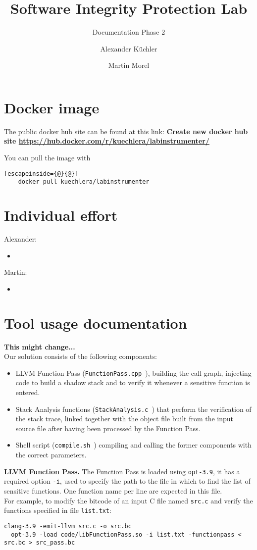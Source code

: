 \documentclass{llncs}
\title{Software Integrity Protection Lab}
\subtitle{Documentation Phase 2}
\author{Alexander K\"uchler \and Martin Morel}
\institute{Technical University of Munich\\
Department of Computer Science\\
\email{kuechler@in.tum.de}, \email{martin.morel@tum.de}}
\newcommand{\todo}[1]{\textbf{\color{red} #1}}
\newcommand{\llvmpass}{\texttt{FunctionPass.cpp }}
\newcommand{\stacka}{\texttt{StackAnalysis.c }}
\newcommand{\script}{\texttt{compile.sh }}
\begin{document}
\maketitle

\section{Docker image}
The public docker hub site can be found at this link: \todo{Create new docker hub site \url{https://hub.docker.com/r/kuechlera/labinstrumenter/}}

You can pull the image with
\begin{lstlisting}[escapeinside={@}{@}]
    docker pull kuechlera/labinstrumenter
\end{lstlisting}

\section{Individual effort}
Alexander:
\begin{itemize}
  \item
\end{itemize}
Martin:
\begin{itemize}
  \item
\end{itemize}

\newpage

\section{Tool usage documentation}
\todo{This might change...}\\
Our solution consists of the following components:
\begin{itemize}
  \item LLVM Function Pass (\llvmpass), building the call graph, injecting code to build a shadow stack and to verify it whenever a sensitive function is entered.
  \item Stack Analysis functions (\stacka) that perform the verification of the stack trace, linked together with the object file built from the input source file after having been processed by the Function Pass.
  \item Shell script (\script) compiling and calling the former components with the correct parameters.
\end{itemize}

\noindent\textbf{LLVM Function Pass.}\newline
The Function Pass is loaded using \texttt{opt-3.9}, it has a required option \texttt{-i}, used to specify the path to the file in which to find the list of sensitive functions. One function name per line are expected in this file.\\
For example, to modify the bitcode of an input C file named \texttt{src.c} and verify the functions specified in file \texttt{list.txt}:
\begin{lstlisting}[basicstyle=\scriptsize]
  clang-3.9 -emit-llvm src.c -o src.bc
  opt-3.9 -load code/libFunctionPass.so -i list.txt -functionpass < src.bc > src_pass.bc
\end{lstlisting}
\end{document}

